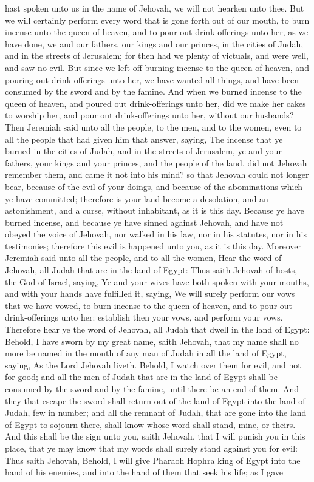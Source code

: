 hast spoken unto us in the name of Jehovah, we will not hearken unto thee. But we will certainly perform every word that is gone forth out of our mouth, to burn incense unto the queen of heaven, and to pour out drink-offerings unto her, as we have done, we and our fathers, our kings and our princes, in the cities of Judah, and in the streets of Jerusalem; for then had we plenty of victuals, and were well, and saw no evil. But since we left off burning incense to the queen of heaven, and pouring out drink-offerings unto her, we have wanted all things, and have been consumed by the sword and by the famine. And when we burned incense to the queen of heaven, and poured out drink-offerings unto her, did we make her cakes to worship her, and pour out drink-offerings unto her, without our husbands?  Then Jeremiah said unto all the people, to the men, and to the women, even to all the people that had given him that answer, saying, The incense that ye burned in the cities of Judah, and in the streets of Jerusalem, ye and your fathers, your kings and your princes, and the people of the land, did not Jehovah remember them, and came it not into his mind? so that Jehovah could not longer bear, because of the evil of your doings, and because of the abominations which ye have committed; therefore is your land become a desolation, and an astonishment, and a curse, without inhabitant, as it is this day. Because ye have burned incense, and because ye have sinned against Jehovah, and have not obeyed the voice of Jehovah, nor walked in his law, nor in his statutes, nor in his testimonies; therefore this evil is happened unto you, as it is this day.  Moreover Jeremiah said unto all the people, and to all the women, Hear the word of Jehovah, all Judah that are in the land of Egypt: Thus saith Jehovah of hosts, the God of Israel, saying, Ye and your wives have both spoken with your mouths, and with your hands have fulfilled it, saying, We will surely perform our vows that we have vowed, to burn incense to the queen of heaven, and to pour out drink-offerings unto her: establish then your vows, and perform your vows. Therefore hear ye the word of Jehovah, all Judah that dwell in the land of Egypt: Behold, I have sworn by my great name, saith Jehovah, that my name shall no more be named in the mouth of any man of Judah in all the land of Egypt, saying, As the Lord Jehovah liveth. Behold, I watch over them for evil, and not for good; and all the men of Judah that are in the land of Egypt shall be consumed by the sword and by the famine, until there be an end of them. And they that escape the sword shall return out of the land of Egypt into the land of Judah, few in number; and all the remnant of Judah, that are gone into the land of Egypt to sojourn there, shall know whose word shall stand, mine, or theirs. And this shall be the sign unto you, saith Jehovah, that I will punish you in this place, that ye may know that my words shall surely stand against you for evil: Thus saith Jehovah, Behold, I will give Pharaoh Hophra king of Egypt into the hand of his enemies, and into the hand of them that seek his life; as I gave 